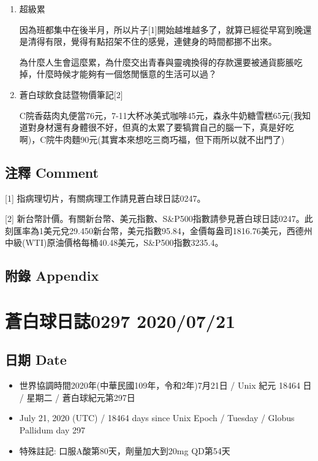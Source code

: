 \documentclass[
]{article}
\providecommand{\tightlist}{%
  \setlength{\itemsep}{0pt}\setlength{\parskip}{0pt}}
\begin{document}
\begin{enumerate}
\def\labelenumi{\arabic{enumi}.}
\item
  超級累

  因為班都集中在後半月，所以片子{[}1{]}開始越堆越多了，就算已經從早寫到晚還是清得有限，覺得有點招架不住的感覺，連健身的時間都挪不出來。

  為什麼人生會這麼累，為什麼交出青春與靈魂換得的存款還要被通貨膨脹吃掉，什麼時候才能夠有一個悠閒愜意的生活可以過？
\item
  蒼白球飲食誌暨物價筆記{[}2{]}

  C院香菇肉丸便當76元，7-11大杯冰美式咖啡45元，森永牛奶糖雪糕65元(我知道對身材還有身體很不好，但真的太累了要犒賞自己的腦一下，真是好吃啊)，C院牛肉麵90元(其實本來想吃三商巧福，但下雨所以就不出門了)
\end{enumerate}

\hypertarget{ux6ce8ux91cb-comment-18}{%
\subsection{注釋 Comment}\label{ux6ce8ux91cb-comment-18}}

{[}1{]} 指病理切片，有關病理工作請見蒼白球日誌0247。

{[}2{]}
新台幣計價。有關新台幣、美元指數、S\&P500指數請參見蒼白球日誌0247。此刻匯率為1美元兌29.450新台幣，美元指數95.84，金價每盎司1816.76美元，西德州中級(WTI)原油價格每桶40.48美元，S\&P500指數3235.4。

\hypertarget{ux9644ux9304-appendix-18}{%
\subsection{附錄 Appendix}\label{ux9644ux9304-appendix-18}}

\hypertarget{ux84bcux767dux7403ux65e5ux8a8c0297-20200721}{%
\section{蒼白球日誌0297
2020/07/21}\label{ux84bcux767dux7403ux65e5ux8a8c0297-20200721}}

\hypertarget{ux65e5ux671f-date-19}{%
\subsection{日期 Date}\label{ux65e5ux671f-date-19}}

\begin{itemize}
\tightlist
\item
  世界協調時間2020年(中華民國109年，令和2年)7月21日 / Unix 紀元 18464 日
  / 星期二 / 蒼白球紀元第297日
\item
  July 21, 2020 (UTC) / 18464 days since Unix Epoch / Tuesday / Globus
  Pallidum day 297
\item
  特殊註記: 口服A酸第80天，劑量加大到20mg QD第54天
\end{itemize}
\end{document}
